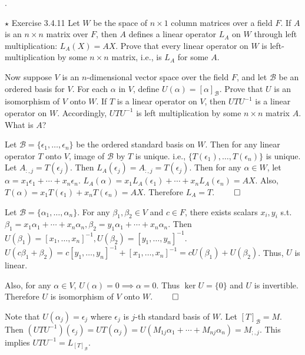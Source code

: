 \documentclass[8pt]{beamer}
\newcommand{\mc}[1]{\mathcal{#1}}
\begin{document}
\begin{frame}{.}
    \begin{block}{$\star$ Exercise 3.4.11}
        Let $W$ be the space of $n \times 1$ column matrices over a field $F$.
        If $A$ is an $n \times n$ matrix over $F$, then $A$ defines a linear operator $L_A$ on $W$ through left multiplication: $L_A (X) = AX$.
        Prove that every linear operator on $W$ is left-multiplication by some $n\times n$ matrix, i.e., is $L_A$ for some $A$.

        Now suppose $V$ is an $n$-dimensional vector space over the field $F$, and let $\mc{B}$ be an ordered basis for $V$. For each $\alpha$ in $V$, define $U(\alpha) =[\alpha]_{\mc{B}}$.
        Prove that $U$ is an isomorphism of $V$ onto $W$.
        If $T$ is a linear operator on $V$, then $UTU^{-1}$ is a linear operator on $W$. Accordingly, $UTU^{-1}$ is left multiplication by some $n\times n$ matrix $A$.
        What is $A$?
    \end{block}

    Let $\mc{B} = \{\epsilon_1, \dots, \epsilon_n\}$ be the ordered standard basis on $W$. Then for any linear operator $T$ onto $V$, image of $\mc{B}$ by $T$ is unique. i.e., $\{T(\epsilon_1), \dots, T(\epsilon_n)\}$ is unique.
    Let $A_{:, j} = T(\epsilon_j)$.
    Then $L_A(\epsilon_j) = A_{:, j} = T(\epsilon_j)$.
    Then for any $\alpha \in W$, let $\alpha = x_1 \epsilon_1 + \cdots + x_n \epsilon_n$.
    $L_{A}(\alpha) = x_1 L_A(\epsilon_1) + \cdots + x_n L_A(\epsilon_n) = AX$.
    Also, $T(\alpha) = x_1 T(\epsilon_1) + x_n T(\epsilon_n) = AX$.
    Therefore $L_A = T$.
    $\qed$

    Let $\mc{B} = \{\alpha_1, \dots, \alpha_n\}$. For any $\beta_1, \beta_2 \in V$ and $c \in F$, there exists scalars $x_i, y_i$ s.t. $\beta_1 = x_1 \alpha_1 + \cdots + x_n \alpha_n, \beta_2 = y_1 \alpha_1 + \cdots + x_n \alpha_n$.
    Then $U(\beta_1) = [x_1, \dots, x_n]^{-1}, U(\beta_2) = [y_1, \dots, y_n]^{-1}$.
    $U(c\beta_1 + \beta_2) = c [y_1, \dots , y_n]^{-1} + [x_1, \dots , x_n]^{-1} = c U(\beta_1) + U(\beta_2)$.
    Thus, $U$ is linear.

    Also, for any $\alpha \in V$, $U(\alpha) = 0 \implies \alpha = 0$.
    Thus $\ker U = \{0\}$ and $U$ is invertible.
    Therefore $U$ is isomorphism of $V$ onto $W$.
    $\qed$

    Note that $U(\alpha_j) = \epsilon_j$ where $\epsilon_j$ is $j$-th standard basis of $W$.
    Let $[T]_{\mc{B}} = M$.
    Then $(UTU^{-1}) (\epsilon_j) = UT (\alpha_j) = U(M_{1j} \alpha_1 + \cdots + M_{nj} \alpha_n) = M_{;, j}$.
    This implies $UTU^{-1} = L_{[T]_{\mc{B}}}$.
\end{frame}
\end{document}
